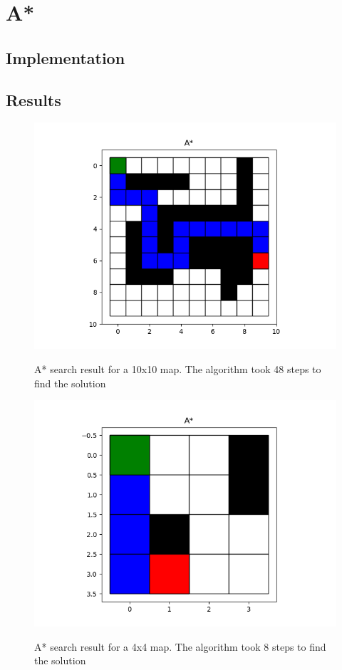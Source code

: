 \documentclass[journal]{IEEEtran}
\begin{document}
    \section{A*} \label{A*}

    \subsection{Implementation}
    
    \subsection{Results}

    \begin{figure}[ht]
        \includegraphics[width=\linewidth]{figures/A_LargeMap_Path.png}
        \label{fig:Dijkstra_Weights_Example}
        \caption{A* search result for a 10x10 map. The algorithm took 48 steps to find the solution}
    \end{figure} 

    \begin{figure}[ht]
        \includegraphics[width=\linewidth]{figures/A_SmallMap_Path.png}
        \label{fig:Dijkstra_Weights_Example}
        \caption{A* search result for a 4x4 map. The algorithm took 8 steps to find the solution}
    \end{figure} 

    \printbibliography
\end{document}
